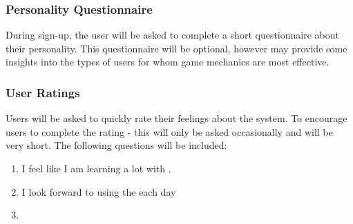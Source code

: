 \subsubsection{Personality Questionnaire}
During sign-up, the user will be asked to complete a short questionnaire about their personality. This questionnaire will be optional, however may provide some insights into the types of users for whom game mechanics are most effective. 

\subsubsection{User Ratings}
Users will be asked to quickly rate their feelings about the system. To encourage users to complete the rating - this will only be asked occasionally and will be very short. The following questions will be included:

\begin{enumerate}
    \item I feel like I am learning a lot with \SoftName.
    \item I look forward to using the \SoftName each day
    \item 
\end{enumerate}
